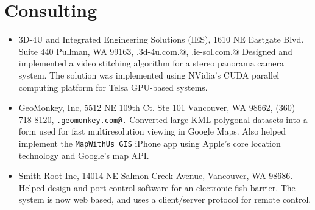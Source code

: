 \documentclass[10pt]{article}
\begin{document}


\section*{Consulting}

\begin{itemize}

\item 3D-4U and Integrated Engineering Solutions (IES), 
1610 NE Eastgate Blvd.
Suite 440
Pullman, WA 99163,
\verb@www.3d-4u.com.@, \verb@www.ie-sol.com.@
Designed and implemented a video stitching algorithm for
a stereo panorama camera system. The solution was
implemented using NVidia's CUDA parallel computing platform
for Telsa GPU-based systems.


\item GeoMonkey, Inc, 
5512 NE 109th Ct. Ste 101
Vancouver, WA 98662,
(360) 718-8120,
{\tt \verb@www.geomonkey.com@.}  
  Converted large KML polygonal datasets into a form used for
  fast multiresolution viewing in Google Maps.
  Also helped implement the {\tt MapWithUs GIS} iPhone app using Apple's core location technology
  and Google's map API.
\item Smith-Root Inc, 14014 NE Salmon Creek Avenue, Vancouver, WA 98686.\\
Helped design and port control software for an
electronic fish barrier. The system is now web based, and uses a 
client/server protocol for remote control.
\end{itemize}
\end{document}
